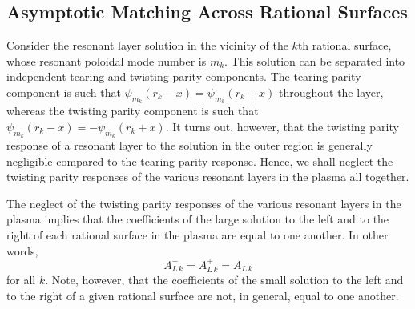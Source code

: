 \documentclass[12pt,prb,aps]{revtex4-1}
\begin{document}
\subsection{Asymptotic Matching Across  Rational Surfaces}\label{sa7}
Consider the resonant layer solution in the vicinity of the $k$th  rational surface, whose resonant poloidal mode number is $m_k$. 
This solution can be separated into independent tearing and twisting parity components.\cite{ggj}
The tearing parity   component is such that $\psi_{m_k}(r_k-x)=\psi_{m_k}(r_k+x)$ throughout the layer, whereas the  twisting parity component is such that
$\psi_{m_k}(r_k-x)=-\psi_{m_k}(r_k+x)$. It turns out, however, that the twisting parity response of a resonant layer to the solution in the outer region is generally negligible compared to the tearing parity response.\cite{connor,twist,am3}
Hence,  we shall neglect the twisting parity responses of the various resonant layers  in the plasma all together. 

The neglect of the twisting parity responses of the various resonant layers in the plasma implies that the coefficients of the large solution to the left and to the right of
each rational surface in the plasma are equal to one another.\cite{am1} In other words,
\begin{equation}\label{tear}
A_{L\,k}^- = A_{L\,k}^+= A_{L\,k}
\end{equation}
for all $k$. 
 Note, however, that the coefficients of the small solution to the left and to the right of a given rational surface are not, in general, equal to one another. 
\end{document}
